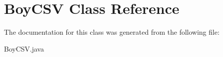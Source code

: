 \hypertarget{class_boy_c_s_v}{}\section{Boy\+C\+SV Class Reference}
\label{class_boy_c_s_v}


The documentation for this class was generated from the following file\+:\begin{DoxyCompactItemize}
\item 
Boy\+C\+S\+V.\+java\end{DoxyCompactItemize}
